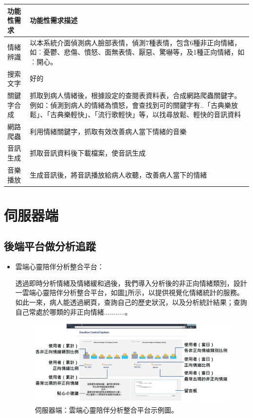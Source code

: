 \documentclass[12pt]{scrreprt}
\begin{document}
\begin{center}  
\begin{tabular}{|l| p{10cm}|}  
\hline  
功能性需求 & 功能性需求描述   \\ \hline  
情緒辨識 &以本系統介面偵測病人臉部表情，偵測7種表情，包含6種非正向情緒，如︰憂鬱、悲傷、憤怒、面無表情、厭惡、驚嚇等，及1種正向情緒，如︰開心。    \\ \hline  
搜索文字& 好的\\\hline
關鍵字合成 & 抓取到病人情緒後，根據設定的查閱表資料表，合成網路爬蟲關鍵字。例如：偵測到病人的情緒為憤怒，會查找到可的關鍵字有..「古典樂放鬆」、「古典樂輕快」、「流行歌輕快」等，以找尋放鬆、輕快的音訊資料    \\ \hline  
網路爬蟲 & 利用情緒關鍵字，抓取有效改善病人當下情緒的音樂 \\ \hline
音訊生成 & 抓取音訊資料後下載檔案，使音訊生成 \\ \hline
音樂播放 & 生成音訊後，將音訊播放給病人收聽，改善病人當下的情緒 \\ \hline

\end{tabular}  
\end{center}  


\section{伺服器端}

\subsection{後端平台做分析追蹤}
\begin{itemize}
\item{\begin{bfseries}{雲端心靈陪伴分析整合平台：}\end{bfseries}}
透過即時分析情緒及情緒緩和過後，我們導入分析後的非正向情緒類別，設計一雲端心靈陪伴分析整合平台，如圖\ref{fig:webframework}所示，以提供視覺化情緒統計的服務。如此一來，病人能透過網頁，查詢自己的歷史狀況，以及分析統計結果；查詢自己常處於哪類的非正向情緒...........。
\begin{figure}[!h]
\begin{center}
\includegraphics[width=1\textwidth]{./figs/Web.pdf}
\end{center}
\caption{伺服器端：雲端心靈陪伴分析整合平台示例圖。}
\label{fig:webframework}
\end{figure}
\end{itemize}
\end{document}
